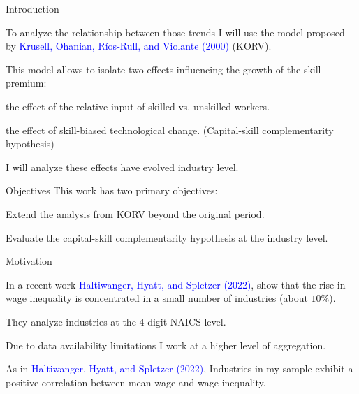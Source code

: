 \documentclass[notes,11pt, aspectratio=169]{beamer}
\newenvironment{wideitemize}{\itemize\addtolength{\itemsep}{10pt}}{\enditemize}
\begin{document}
\begin{frame}{Introduction}
 \begin{wideitemize}
 \item To analyze the relationship between those trends I will use the model proposed by \textcolor{blue}{Krusell, Ohanian, Ríos‐Rull, and Violante (2000)} (KORV).
 \item This model allows to isolate two effects influencing the growth of the skill premium:

 \begin{wideitemize}
 \item the effect of the relative input of skilled vs. unskilled workers.
 \item the effect of skill-biased technological change. (Capital-skill complementarity hypothesis)
 \end{wideitemize} 

 \item I will analyze these effects have evolved industry level. 
 \end{wideitemize}

\end{frame}

\begin{frame}{Objectives}
This work has two primary objectives:
\vspace*{0.4cm}
\begin{wideitemize}
 \item Extend the analysis from KORV beyond the original period.
 \item Evaluate the capital-skill complementarity hypothesis at the industry level.
\end{wideitemize}
\vspace*{1cm}
\end{frame}


\begin{frame}{Motivation}
\begin{wideitemize}
 \item In a recent work \textcolor{blue}{Haltiwanger, Hyatt, and Spletzer (2022)}, show that the rise in wage inequality is concentrated in a small number of industries (about $10\%$).
 \begin{wideitemize}
 \item They analyze industries at the 4-digit NAICS level.
 \item Due to data availability limitations I work at a higher level of aggregation.
 \end{wideitemize}
 \item As in \textcolor{blue}{Haltiwanger, Hyatt, and Spletzer (2022)}, Industries in my sample exhibit a positive correlation between mean wage and wage inequality.
\end{wideitemize}
\end{frame}
\end{document}
